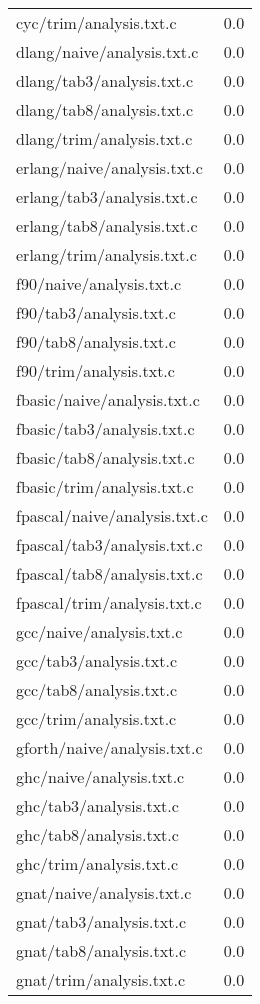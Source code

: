 \begin{longtable}{l r}
{cyc/trim/analysis.txt.c} & 0.0  \\
{dlang/naive/analysis.txt.c} & 0.0  \\
{dlang/tab3/analysis.txt.c} & 0.0  \\
{dlang/tab8/analysis.txt.c} & 0.0  \\
{dlang/trim/analysis.txt.c} & 0.0  \\
{erlang/naive/analysis.txt.c} & 0.0  \\
{erlang/tab3/analysis.txt.c} & 0.0  \\
{erlang/tab8/analysis.txt.c} & 0.0  \\
{erlang/trim/analysis.txt.c} & 0.0  \\
{f90/naive/analysis.txt.c} & 0.0  \\
{f90/tab3/analysis.txt.c} & 0.0  \\
{f90/tab8/analysis.txt.c} & 0.0  \\
{f90/trim/analysis.txt.c} & 0.0  \\
{fbasic/naive/analysis.txt.c} & 0.0  \\
{fbasic/tab3/analysis.txt.c} & 0.0  \\
{fbasic/tab8/analysis.txt.c} & 0.0  \\
{fbasic/trim/analysis.txt.c} & 0.0  \\
{fpascal/naive/analysis.txt.c} & 0.0  \\
{fpascal/tab3/analysis.txt.c} & 0.0  \\
{fpascal/tab8/analysis.txt.c} & 0.0  \\
{fpascal/trim/analysis.txt.c} & 0.0  \\
{gcc/naive/analysis.txt.c} & 0.0  \\
{gcc/tab3/analysis.txt.c} & 0.0  \\
{gcc/tab8/analysis.txt.c} & 0.0  \\
{gcc/trim/analysis.txt.c} & 0.0  \\
{gforth/naive/analysis.txt.c} & 0.0  \\
{ghc/naive/analysis.txt.c} & 0.0  \\
{ghc/tab3/analysis.txt.c} & 0.0  \\
{ghc/tab8/analysis.txt.c} & 0.0  \\
{ghc/trim/analysis.txt.c} & 0.0  \\
{gnat/naive/analysis.txt.c} & 0.0  \\
{gnat/tab3/analysis.txt.c} & 0.0  \\
{gnat/tab8/analysis.txt.c} & 0.0  \\
{gnat/trim/analysis.txt.c} & 0.0  \\

\end{longtable}
